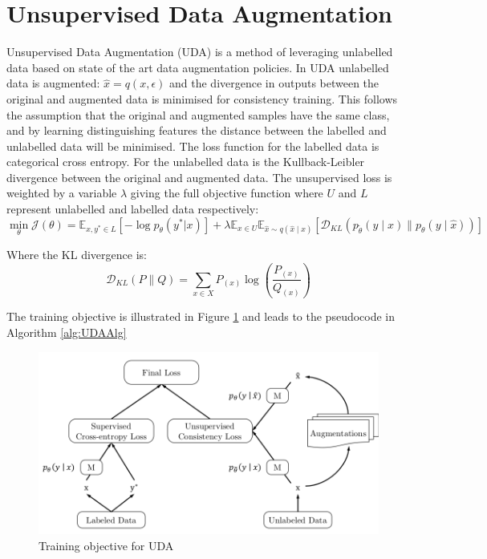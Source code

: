 \documentclass[a4paper]{article}
\begin{document}
\section{Unsupervised Data Augmentation}
Unsupervised Data Augmentation (UDA) is a method of leveraging unlabelled data based on state of the art data augmentation policies. In UDA unlabelled data is augmented: $\hat{x}=q(x,\epsilon)$ and the divergence in outputs between the original and augmented data is minimised for consistency training. This follows the assumption that the original and augmented samples have the same class, and by learning distinguishing features the distance between the labelled and unlabelled data will be minimised. The loss function for the labelled data is categorical cross entropy. For the unlabelled data is the Kullback-Leibler divergence between the original and augmented data. The unsupervised loss is weighted by a variable $\lambda$ giving the full objective function where $U$ and $L$ represent unlabelled and labelled data respectively:
\begin{equation}
\min_{\theta} \mathcal{J}(\theta) =\mathbb{E}_{x,y^* \in L}[-\log p_\theta (y^* | x)]+\lambda\mathbb{E}_{x \in U}\mathbb{E}_{\hat{x}\sim q(\hat{x} \mid x)}[\mathcal{D}_{KL}(p_{\tilde{\theta}}(y \mid x) \parallel p_\theta (y \mid \hat{x})) ]
\end{equation}

Where the KL divergence is:
\begin{equation}
\mathcal{D}_{KL}(P \parallel Q) = \sum_{x \in X} P_{(x)} \log \left(\frac{P_{(x)}}{Q_{(x)}}\right)
\end{equation}

The training objective is illustrated in Figure \ref{fig:objective} and leads to the pseudocode in Algorithm \ref{alg:UDAAlg}
\begin{figure}[!ht]
  \begin{center}
    \includegraphics[width=.7\textwidth]{training_objective}
    \caption{Training objective for UDA}
    \label{fig:objective}
  \end{center}
\end{figure}
\end{document}
